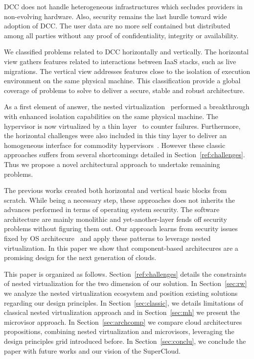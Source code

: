 \documentclass{sig-alternate}
\begin{document}
DCC does not handle heterogeneous infrastructures which secludes providers in non-evolving hardware.
Also, security remains the last hurdle toward wide adoption of DCC. The user data are no more self contained but distributed among all parties without any proof of confidentiality, integrity or availability.

We classified problems related to DCC horizontally and vertically. The horizontal view gathers features related to interactions between IaaS stacks, such as live migrations. The vertical view addresses features close to the isolation of execution environment on the same physical machine. This classification provide a global coverage of problems to solve to deliver a secure, stable and robust architecture.

As a first element of answer, the nested virtualization~\cite{turtle:ibm} performed a breakthrough with enhanced isolation capabilities on the same physical machine. The hypervisor is now virtualized by a thin layer~\cite{cloudvisor:zhang} to counter failures. Furthermore, the horizontal challenges were also included in this tiny layer to deliver an homogeneous interface for commodity hypervisors~\cite{art:blan, xclo:blank}. However these classic approaches suffers from several shortcomings detailed in Section~\ref{ref:challenges}. Thus we propose a novel architectural approach to undertake remaining problems.

The previous works created both horizontal and vertical basic blocks from scratch. While being a necessary step, these approaches does not inherits the advances performed in terms of operating system security. The software architecture are mainly monolithic and yet-another-layer fends off security problems without
figuring them out. Our approach learns from security issues fixed by OS architecure~\cite{} and apply these patterns to leverage nested virtualization. In this paper we show that component-based architecures are a promising design for the next generation of clouds.

This paper is organized as follows. Section~\ref{ref:challenges} details the constraints of nested virtualization for the two dimension of our solution. In Section~\ref{sec:rw} we analyze the nested virtualization ecosystem and position existing solutions regarding our design principles. In Section~\ref{sec:classic}, we details limitations of classical nested virtualization approach and in Section~\ref{sec:mh} we present the microvisor approach. In Section~\ref{sec:archcomp} we compare cloud architectures propositions, combining nested virtualization and microvisors, leveraging the design principles grid introduced before.
In Section~\ref{sec:conclu}, we conclude the paper with future works and our vision of the SuperCloud.
\end{document}

